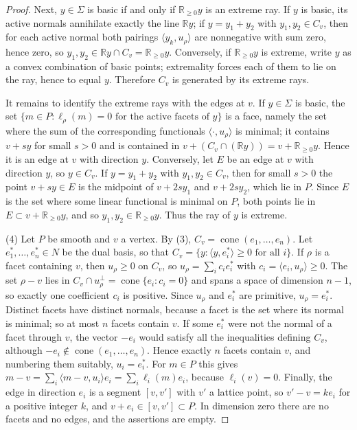 \begin{proof}
Next, $y\in\Sigma$ is basic if and only if $\mathbb R_{\geq0}y$ is an extreme ray. If $y$ is basic, its active normals annihilate exactly the line $\mathbb Ry$; if $y=y_1+y_2$ with $y_1,y_2\in C_v$, then for each active normal both pairings $\langle y_k,u_\rho\rangle$ are nonnegative with sum zero, hence zero, so $y_1,y_2\in\mathbb Ry\cap C_v=\mathbb R_{\geq0}y$. Conversely, if $\mathbb R_{\geq0}y$ is extreme, write $y$ as a convex combination of basic points; extremality forces each of them to lie on the ray, hence to equal $y$. Therefore $C_v$ is generated by its extreme rays.

It remains to identify the extreme rays with the edges at $v$. If $y\in\Sigma$ is basic, the set $\{m\in P:\ell_\rho(m)=0\text{ for the active facets of }y\}$ is a face, namely the set where the sum of the corresponding functionals $\langle\cdot,u_\rho\rangle$ is minimal; it contains $v+sy$ for small $s>0$ and is contained in $v+(C_v\cap(\mathbb Ry))=v+\mathbb R_{\geq0}y$. Hence it is an edge at $v$ with direction $y$. Conversely, let $E$ be an edge at $v$ with direction $y$, so $y\in C_v$. If $y=y_1+y_2$ with $y_1,y_2\in C_v$, then for small $s>0$ the point $v+sy\in E$ is the midpoint of $v+2sy_1$ and $v+2sy_2$, which lie in $P$. Since $E$ is the set where some linear functional is minimal on $P$, both points lie in $E\subset v+\mathbb R_{\geq0}y$, and so $y_1,y_2\in\mathbb R_{\geq0}y$. Thus the ray of $y$ is extreme.

(4) Let $P$ be smooth and $v$ a vertex. By (3), $C_v=\operatorname{cone}(e_1,\ldots,e_n)$. Let $e_1^*,\ldots,e_n^*\in N$ be the dual basis, so that $C_v=\{y:\langle y,e_i^*\rangle\geq0\text{ for all }i\}$. If $\rho$ is a facet containing $v$, then $u_\rho\geq0$ on $C_v$, so $u_\rho=\sum_ic_ie_i^*$ with $c_i=\langle e_i,u_\rho\rangle\geq0$. The set $\rho-v$ lies in $C_v\cap u_\rho^\perp=\operatorname{cone}\{e_i:c_i=0\}$ and spans a space of dimension $n-1$, so exactly one coefficient $c_i$ is positive. Since $u_\rho$ and $e_i^*$ are primitive, $u_\rho=e_i^*$. Distinct facets have distinct normals, because a facet is the set where its normal is minimal; so at most $n$ facets contain $v$. If some $e_i^*$ were not the normal of a facet through $v$, the vector $-e_i$ would satisfy all the inequalities defining $C_v$, although $-e_i\notin\operatorname{cone}(e_1,\ldots,e_n)$. Hence exactly $n$ facets contain $v$, and numbering them suitably, $u_i=e_i^*$. For $m\in P$ this gives $m-v=\sum_i\langle m-v,u_i\rangle e_i=\sum_i\ell_i(m)e_i$, because $\ell_i(v)=0$. Finally, the edge in direction $e_i$ is a segment $[v,v']$ with $v'$ a lattice point, so $v'-v=ke_i$ for a positive integer $k$, and $v+e_i\in[v,v']\subset P$. In dimension zero there are no facets and no edges, and the assertions are empty.
\end{proof}

